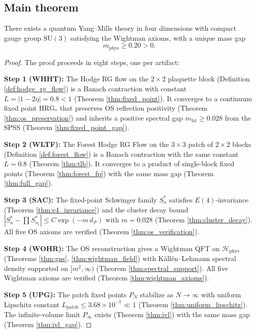 \subsection{Main theorem}
\label{ssec:main_theorem}

\begin{theorem}
\label{thm:clay_main}
There exists a quantum Yang--Mills theory in four dimensions with
compact gauge group $\mathrm{SU}(3)$ satisfying the Wightman axioms,
with a unique mass gap
\[
m_{\mathrm{phys}}\ge 0.20>0.
\]
\end{theorem}

\begin{proof}
The proof proceeds in eight steps, one per artifact:

\textbf{Step 1 (WHHT):} The Hodge RG flow on the $2\times 2$
plaquette block (Definition \ref{def:hodge_rg_flow}) is a Banach
contraction with constant $L=|1-2\eta|=0.8<1$ (Theorem
\ref{thm:fixed_point}). It converges to a continuum fixed point
$\mathrm{HRG}_{*}$ that preserves OS reflection positivity (Theorem
\ref{thm:os_preservation}) and inherits a positive spectral gap
$m_{\mathrm{lat}}\ge 0.028$ from the SPSS (Theorem
\ref{thm:fixed_point_gap}).

\textbf{Step 2 (WLTF):} The Forest Hodge RG Flow on the
$3\times 3$ patch of $2\times 2$ blocks (Definition
\ref{def:forest_flow}) is a Banach contraction with the same
constant $L=0.8$ (Theorem \ref{thm:tlb}). It converges to a product
of single-block fixed points (Theorem \ref{thm:forest_fp}) with the
same mass gap (Theorem \ref{thm:full_gap}).

\textbf{Step 3 (SAC):} The fixed-point Schwinger family $S_{n}^{*}$
satisfies $E(4)$-invariance (Theorem \ref{thm:e4_invariance}) and
the cluster decay bound $|S_{n}^{*}-\prod S_{n_{i}}^{*}|\le
C\exp(-m\,d_{\mathcal{P}})$ with $m=0.028$ (Theorem
\ref{thm:cluster_decay}). All five OS axioms are verified (Theorem
\ref{thm:os_verification}).

\textbf{Step 4 (WOHR):} The OS reconstruction gives a Wightman QFT
on $\mathcal{H}_{\mathrm{phys}}$ (Theorems \ref{thm:gns},
\ref{thm:wightman_field}) with Källén--Lehmann spectral density
supported on $[m^{2},\infty)$ (Theorem \ref{thm:spectral_support}).
All five Wightman axioms are verified (Theorem
\ref{thm:wightman_axioms}).

\textbf{Step 5 (UPG):} The patch fixed points $P_{N}$ stabilize as
$N\to\infty$ with uniform Lipschitz constant $L_{\mathrm{patch}}\le
3.68\times 10^{-7}\ll 1$ (Theorem \ref{thm:uniform_lipschitz}). The
infinite-volume limit $P_{\infty}$ exists (Theorem \ref{thm:ivl})
with the same mass gap (Theorem \ref{thm:ivl_gap}).


\end{proof}
